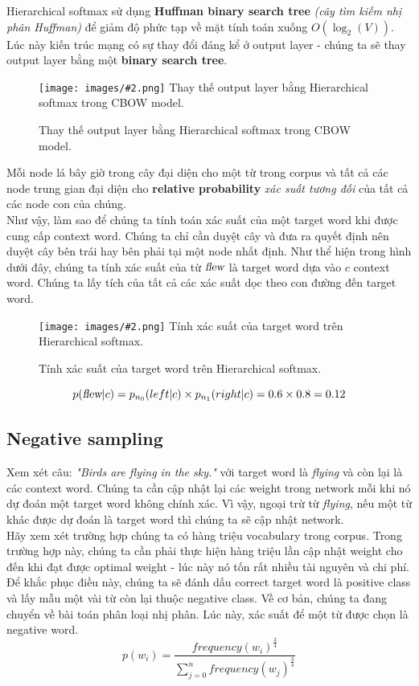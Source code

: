 \documentclass[12pt]{article}
\newcommand{\includeImage}[3]{
\begin{figure}[H]
  \centering
  \texttt{[image: images/\#2.png]}
  \def\temp{#3}\ifx\temp\empty\else\caption{#3}\fi
\end{figure}}
\begin{document}
\indent Hierarchical softmax sử dụng \textbf{Huffman binary search tree} \textit{(cây tìm kiếm nhị phân Huffman)} để giảm độ phức tạp về mặt tính toán xuống $O(\log_2(V))$. Lúc này kiến trúc mạng có sự thay đổi đáng kể ở output layer - chúng ta sẽ thay output layer bằng một \textbf{binary search tree}.

\includeImage{0.99}{11}{Thay thế output layer bằng Hierarchical softmax trong CBOW model.}

\indent Mỗi node lá bây giờ trong cây đại diện cho một từ trong corpus và tất cả các node trung gian đại diện cho \textbf{relative probability} \textit{xác suất tương đối} của tất cả các node con của chúng.\\

\indent Như vậy, làm sao để chúng ta tính toán xác suất của một target word khi được cung cấp context word. Chúng ta chỉ cần duyệt cây và đưa ra quyết định nên duyệt cây bên trái hay bên phải tại một node nhất định. Như thể hiện trong hình dưới đây, chúng ta tính xác suất của từ $\textsl{flew}$ là target word dựa vào $c$ context word. Chúng ta lấy tích của tất cả các xác suất dọc theo con đường đến target word.
\includeImage{0.8}{12}{Tính xác suất của target word trên Hierarchical softmax.}

$$p(\textsl{flew}|c) = p_{n_0}(left|c) \times p_{n_1}(right|c) = 0.6 \times 0.8 = 0.12$$

\subsection{Negative sampling}
Xem xét câu: \textsl{"Birds are flying in the sky."} với target word là \textsl{flying} và còn lại là các context word. Chúng ta cần cập nhật lại các weight trong network mỗi khi nó dự đoán một target word không chính xác. Vì vậy, ngoại trừ từ \textsl{flying}, nếu một từ khác được dự đoán là target word thì chúng ta sẽ cập nhật network.\\

\indent Hãy xem xét trường hợp chúng ta có hàng triệu vocabulary trong corpus. Trong trường hợp này, chúng ta cần phải thực hiện hàng triệu lần cập nhật weight cho đến khi đạt được optimal weight - lúc này nó tốn rất nhiều tài nguyên và chi phí.\\

\indent Để khắc phục điều này, chúng ta sẽ đánh dấu correct target word là positive class và lấy mẫu một vài từ còn lại thuộc negative class. Về cơ bản, chúng ta đang chuyển về bài toán phân loại nhị phân. Lúc này, xác suất để một từ được chọn là negative word.
$$p(w_i) = \dfrac{frequency(w_i)^{\frac{3}{4}}}{\sum^n_{j=0} frequency(w_j)^{\frac{3}{4}}}$$
\end{document}
